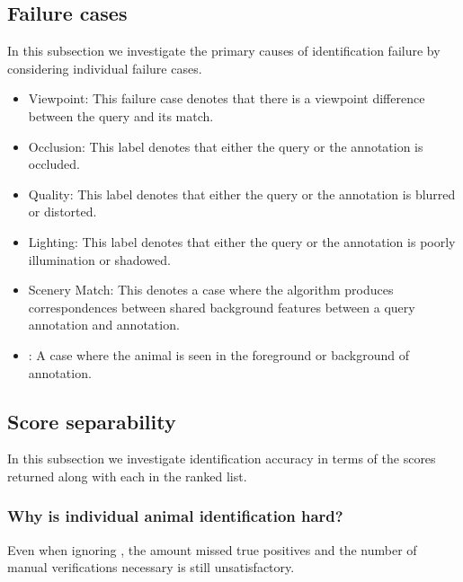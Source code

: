     \subsection{Failure cases}
        In this subsection we investigate the primary causes of identification failure by considering individual
          failure cases.
        
        \begin{itemize}
            \item Viewpoint:
                This failure case denotes that there is a viewpoint difference between the query and its \groundtrue{}
                  match.
                
            \item Occlusion:
                This label denotes that either the query or the \groundtrue{} annotation is occluded.
                
            \item Quality:
                This label denotes that either the query or the \groundtrue{} annotation is blurred or distorted.
                
            \item Lighting:
                This label denotes that either the query or the \groundtrue{} annotation is poorly illumination or
                  shadowed.
                
            \item Scenery Match:
                This denotes a case where the algorithm produces correspondences between shared background features
                  between a query annotation and \aan{\groundfalse{}} annotation.
                
            \item \Photobomb{}:
                A case where the \groundtrue{} animal is seen in the foreground or background of \aan{\groundfalse{}}
                  annotation.
                
        \end{itemize}
        
    \subsection{Score separability}
        In this subsection we investigate identification accuracy in terms of the scores returned along with each
          \name{} in the ranked list.
        
        \subsubsection{Why is individual animal identification hard?}
            Even when ignoring \photobombings{}, the amount missed true positives and the number of manual
              verifications necessary is still unsatisfactory.
            

